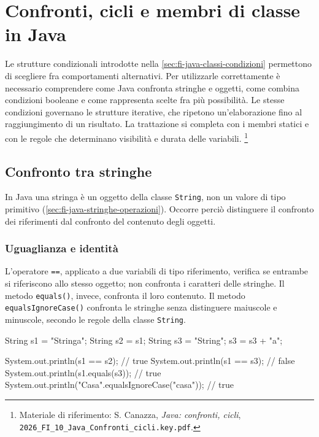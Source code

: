 \chapter{Confronti, cicli e membri di classe in Java}
\label{chap:confronti-cicli-java}

Le strutture condizionali introdotte nella
\cref{sec:fi-java-classi-condizioni} permettono di scegliere fra
comportamenti alternativi. Per utilizzarle correttamente è necessario
comprendere come Java confronta stringhe e oggetti, come combina
condizioni booleane e come rappresenta scelte fra più possibilità.
Le stesse condizioni governano le strutture iterative, che ripetono
un'elaborazione fino al raggiungimento di un risultato. La trattazione
si completa con i membri statici e con le regole che determinano
visibilità e durata delle variabili.
\footnote{Materiale di riferimento: S. Canazza,
\emph{Java: confronti, cicli},
\nolinkurl{2026_FI_10_Java_Confronti_cicli.key.pdf}.}

\section{Confronto tra stringhe}
\label{sec:fi-java-cicli-stringhe}

In Java una stringa è un oggetto della classe \texttt{String},
non un valore di tipo primitivo (\cref{sec:fi-java-stringhe-operazioni}).
Occorre perciò distinguere il confronto dei riferimenti dal confronto
del contenuto degli oggetti.

\subsection{Uguaglianza e identità}
\label{sec:fi-java-cicli-stringhe-uguaglianza}

L'operatore \texttt{==}, applicato a due variabili di tipo riferimento,
verifica se entrambe si riferiscono allo stesso oggetto; non confronta
i caratteri delle stringhe. Il metodo \texttt{equals()}, invece,
confronta il loro contenuto. Il metodo \texttt{equalsIgnoreCase()}
confronta le stringhe senza distinguere maiuscole e minuscole, secondo
le regole della classe \texttt{String}.

\begin{unipdcode}[language=Java]
String s1 = "Stringa";
String s2 = s1;
String s3 = "String";
s3 = s3 + "a";

System.out.println(s1 == s2);       // true
System.out.println(s1 == s3);       // false
System.out.println(s1.equals(s3));  // true
System.out.println("Casa".equalsIgnoreCase("casa")); // true
\end{unipdcode}

